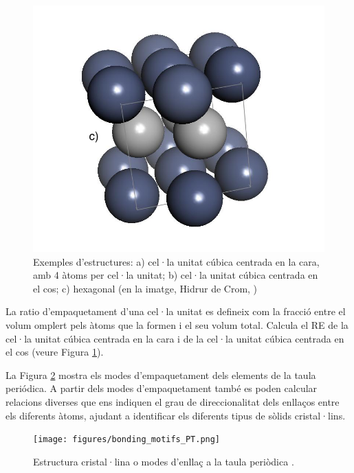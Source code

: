 \begin{figure}[h]
\includegraphics[scale=0.32]{figures/HCP_crystal_structure.png}
\caption[Exemples d'estructures cristal·lines]{Exemples d'estructures: a) cel·la unitat cúbica centrada en la cara, amb 4 àtoms per cel·la unitat; b) cel·la unitat cúbica centrada en el cos; c) hexagonal (en la imatge, Hidrur de Crom, )}
\label{fig:crystal_structure}
\end{figure}

\begin{exr}
La ratio d'empaquetament d'una cel·la unitat es defineix com la fracció entre el volum omplert pels àtoms que la formen i el seu volum total. Calcula el RE de la cel·la unitat cúbica centrada en la cara i de la cel·la unitat cúbica centrada en el cos (veure Figura \ref{fig:crystal_structure}).
\end{exr}

La Figura \ref{fig:bonding_motifs_PT} mostra els modes d'empaquetament dels elements de la taula periódica. A partir dels modes d'empaquetament també es poden calcular relacions diverses que ens indiquen el grau de direccionalitat dels enllaços entre els diferents àtoms, ajudant a identificar els diferents tipus de sòlids cristal·lins.
\begin{figure}[h]
\centering
\texttt{[image: figures/bonding\_motifs\_PT.png]}
\caption{Estructura cristal·lina o modes d'enllaç a la taula periòdica \cite{Yen2008}.}
\label{fig:bonding_motifs_PT}
\end{figure}

